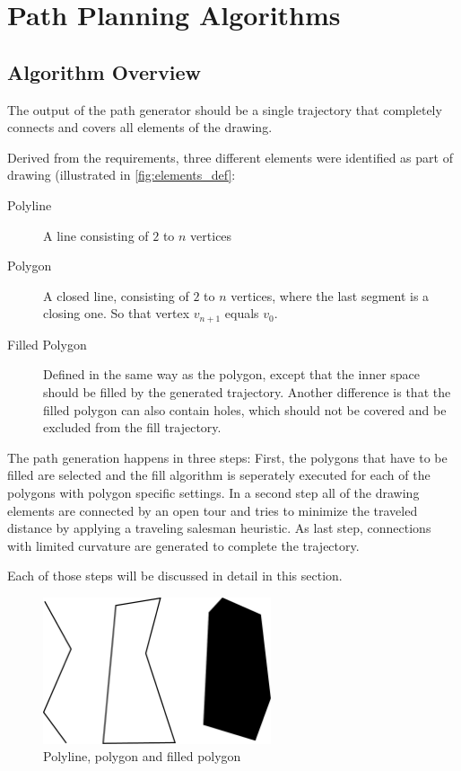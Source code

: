 \chapter{Path Planning Algorithms}
\section{Algorithm Overview}

The output of the path generator should be a single trajectory that completely connects and covers all elements of the drawing.

Derived from the requirements, three different elements were identified as part of drawing (illustrated in \autoref{fig:elements_def}:

\begin{description}
\item[Polyline] A line consisting of $2$ to $n$ vertices
\item[Polygon] A closed line, consisting of $2$ to $n$ vertices, where the last segment is a closing one. So that vertex $v_{n+1}$ equals $v_0$.
\item[Filled Polygon] Defined in the same way as the polygon, except that the inner space should be filled by the generated trajectory. Another difference is that the filled polygon can also contain holes, which should not be covered and be excluded from the fill trajectory.
\end{description}

The path generation happens in three steps: First, the polygons that have to be filled are selected and the fill algorithm is seperately executed for each of the polygons with polygon specific settings. In a second step all of the drawing elements are connected by an open tour and tries to minimize the traveled distance by applying a traveling salesman heuristic. As last step, connections with limited curvature are generated to complete the trajectory.

Each of those steps will be discussed in detail in this section.

\begin{figure}
\centering
\includegraphics[width=0.6\textwidth]{images/path_planning/line_polygon_definition.pdf}
\caption{Polyline, polygon and filled polygon}
\label{fig:elements_def}
\end{figure}

